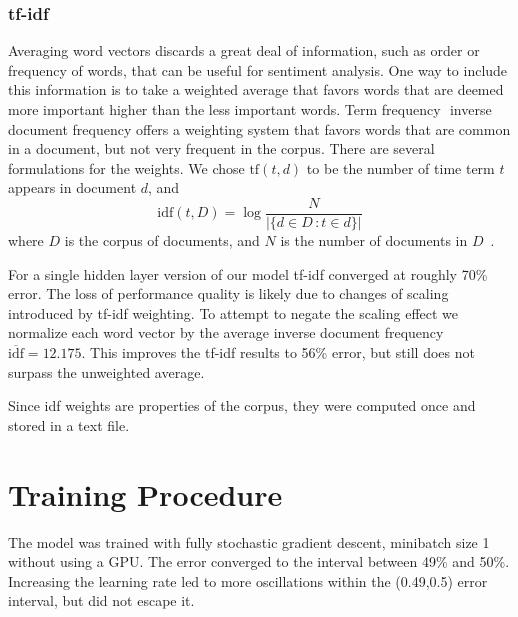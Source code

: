 \documentclass{article} %
\begin{document}
\subsubsection{tf-idf}
Averaging word vectors discards a great deal of information, such as order or frequency of words, that can be useful for sentiment analysis.
One way to include this information is to take a weighted average that favors words that are deemed more important higher than the less important words.
Term frequency \textendash\,\,inverse document frequency offers a weighting system that favors words that are common in a document, but not very frequent in the corpus. There are several formulations for the weights.
We chose $\textrm{tf}(t,d)$ to be the number of time term $t$ appears in document $d$, and 
\[
\textrm{idf}(t,D) = \log\frac{N}{|\{d \in D \,\colon t \in d\}|}
\]
where $D$ is the corpus of documents, and $N$ is the number of documents in $D$~\cite{manning12}.

For a single hidden layer version of our model tf-idf converged at roughly 70\% error.
The loss of performance quality is likely due to changes of scaling introduced by tf-idf weighting. To attempt to negate the scaling effect we normalize each word vector by the average inverse document frequency $\overline{\textrm{idf}} = 12.175$.
This improves the tf-idf results to 56\% error, but still does not surpass the unweighted average.

Since idf weights are properties of the corpus, they were computed once and stored in a text file.



\section{Training Procedure}
\label{train}
The model was trained with fully stochastic gradient descent, minibatch size 1 without using a GPU.
The error converged to the interval between 49\% and 50\%. Increasing the learning rate led to more oscillations within the (0.49,0.5) error interval, but did not escape it.
\end{document}
